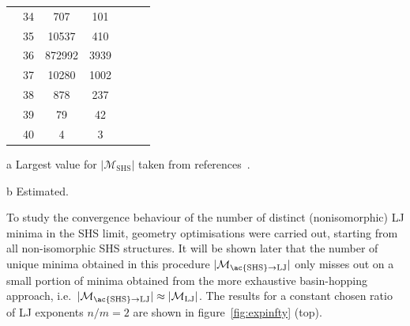 \begin{table}[htbp]
{\begin{threeparttable}[para]
\begin{tabular}{clccccc}
       & 34  & 707    				& 101  &                       &                       &                     \\
       & 35  & 10537  				& 410  &                       &                       &                     \\
       & 36  & 872992 				& 3939 &                       &                       &                     \\
       & 37  & 10280  				& 1002 &                       &                       &                     \\
       & 38  & 878    				& 237  &                       &                       &                     \\
       & 39  & 79     				& 42   &                       &                       &                     \\
       & 40  & 4      				& 3    &                       &                       &                     \\\bottomrule
        \end{tabular}
            \begin{tablenotes}
            \item[a]{Largest value for $|\mathcal{M}_\mathrm{SHS}|$ taken from references~\cite{Holmes-Cerfon_EnumeratingRigidSphere_2016,Hoy_Structurefinitesphere_2012,Hoy_Structuredynamicsmodel_2015}.} \item[b]{Estimated.}
            \end{tablenotes}
        \end{threeparttable}}
    \end{table}%
%
To study the convergence behaviour of the number of distinct (nonisomorphic) LJ
minima in the \ac{SHS} limit, geometry optimisations were carried out, starting
from all non-isomorphic \ac{SHS} structures. It will be shown later that the
number of unique minima obtained in this procedure
$|\mathcal{M}_\mathrm{\ac{SHS}\to LJ}|$ only misses out on a small portion of
minima obtained from the more exhaustive basin-hopping approach,
i.e.~$|\mathcal{M}_\mathrm{\ac{SHS}\to LJ}|\approx|\mathcal{M}_\mathrm{LJ}|$.
The results for a constant chosen ratio of \ac{LJ} exponents $n/m=2$ are shown in
figure~\ref{fig:expinfty} (top).
%
